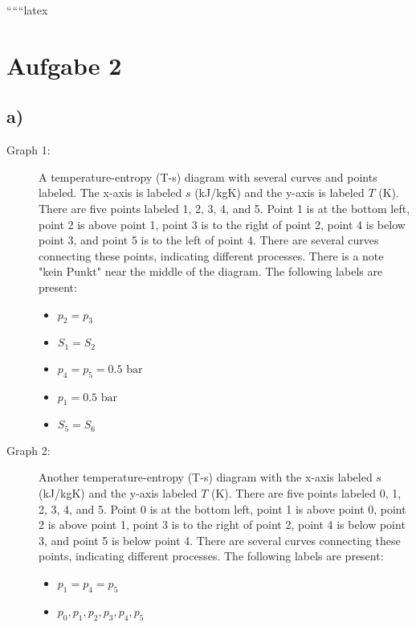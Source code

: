 
``````latex


\section*{Aufgabe 2}

\subsection*{a)}

\begin{description}
    \item[Graph 1:] A temperature-entropy (T-s) diagram with several curves and points labeled. The x-axis is labeled $s$ (kJ/kgK) and the y-axis is labeled $T$ (K). There are five points labeled 1, 2, 3, 4, and 5. Point 1 is at the bottom left, point 2 is above point 1, point 3 is to the right of point 2, point 4 is below point 3, and point 5 is to the left of point 4. There are several curves connecting these points, indicating different processes. There is a note "kein Punkt" near the middle of the diagram. The following labels are present:
    \begin{itemize}
        \item $p_2 = p_3$
        \item $S_1 = S_2$
        \item $p_4 = p_5 = 0.5 \text{ bar}$
        \item $p_1 = 0.5 \text{ bar}$
        \item $S_5 = S_6$
    \end{itemize}
\end{description}

\begin{description}
    \item[Graph 2:] Another temperature-entropy (T-s) diagram with the x-axis labeled $s$ (kJ/kgK) and the y-axis labeled $T$ (K). There are five points labeled 0, 1, 2, 3, 4, and 5. Point 0 is at the bottom left, point 1 is above point 0, point 2 is above point 1, point 3 is to the right of point 2, point 4 is below point 3, and point 5 is below point 4. There are several curves connecting these points, indicating different processes. The following labels are present:
    \begin{itemize}
        \item $p_1 = p_4 = p_5$
        \item $p_0, p_1, p_2, p_3, p_4, p_5$
    \end{itemize}
\end{description}

